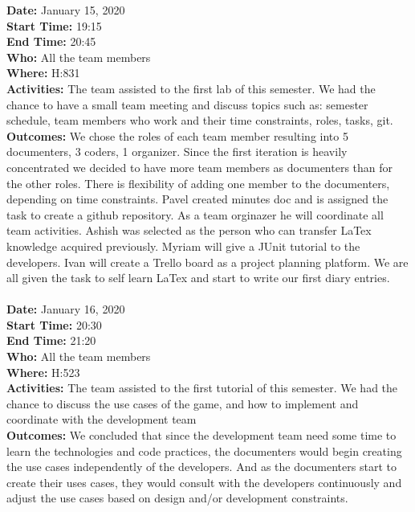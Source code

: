 \documentclass[12pt]{article}
\begin{document}
{\bf Date:} January 15, 2020\\
{\bf Start Time:} 19:15\\
{\bf End Time:} 20:45\\
{\bf Who:} All the team members\\
{\bf Where:} H:831\\
{\bf Activities:} The team assisted to the first lab of this semester. We had the chance to have a small team meeting and discuss topics such as: semester schedule, team members who work and their time constraints, roles, tasks, git.\\
{\bf Outcomes:} We chose the roles of each team member resulting into 5 documenters, 3 coders, 1 organizer. Since the first iteration is heavily concentrated we decided to have more team members as documenters than for the other roles. There is flexibility of adding one member to the documenters, depending on time constraints. Pavel created minutes doc and is assigned the task to create a github repository. As a team orginazer he will coordinate all team activities. Ashish was selected as the person who can transfer LaTex knowledge acquired previously. Myriam will give a JUnit tutorial to the developers. Ivan will create a Trello board as a project planning platform. We are all given the task to self learn LaTex and start to write our first diary entries.\\\\

{\bf Date:} January 16, 2020\\
{\bf Start Time:} 20:30\\
{\bf End Time:} 21:20\\
{\bf Who:} All the team members\\
{\bf Where:} H:523\\
{\bf Activities:} The team assisted to the first tutorial of this semester. We had the chance to discuss the use cases of the game, and how to implement and coordinate with the development team \\
{\bf Outcomes:} We concluded that since the development team need some time to learn the technologies and code practices, the documenters would begin creating the use cases independently of the developers. And as the documenters start to create their uses cases, they would consult with the developers continuously and adjust the use cases based on design and/or development constraints.\\\\
\end{document}
